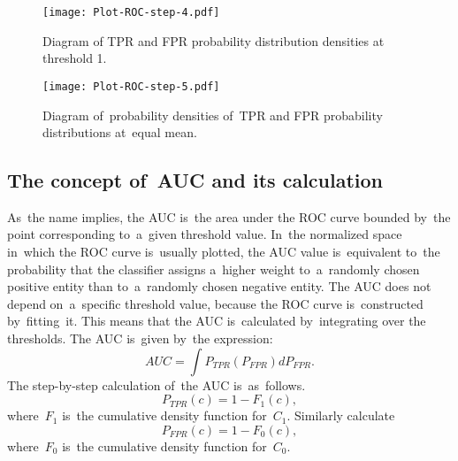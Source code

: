 \documentclass[]{scrreprt}
\begin{document}
%
\begin{figure}[ht]
	\centering
	\texttt{[image: Plot-ROC-step-4.pdf]}
	\caption{Diagram of TPR and FPR probability distribution densities at threshold 1.}
	\label{fig:plot-TPR-FPR-prob-density-4}
\end{figure}
%
\begin{figure}[ht]
	\centering
	\texttt{[image: Plot-ROC-step-5.pdf]}
	\caption{Diagram of~probability densities of~TPR and FPR probability distributions at~equal mean.}
	\label{fig:plot-TPR-FPR-prob-density-5}
\end{figure}
%
\subsection{The concept of~AUC and its calculation}
As~the name implies, the AUC is~the area under the ROC curve bounded by~the point corresponding to~a~given threshold value. In~the normalized space in~which the ROC curve is~usually plotted, the AUC value is~equivalent to~the probability that the classifier assigns a~higher weight to~a~randomly chosen positive entity than to~a~randomly chosen negative entity. The AUC does not depend on~a~specific threshold value, because the ROC curve is~constructed by~fitting~it. This means that the AUC is~calculated by~integrating over the thresholds. The AUC is~given by~the expression:
\begin{equation}\label{eq:AUC-computation-0}
AUC = \int P_{TPR}(P_{FPR}) d P_{FPR}.
\end{equation}
The step-by-step calculation of~the AUC is~as~follows.
\begin{equation}\label{eq:AUC-computation-1}
P_{TPR}(c) = 1 - F_{1}(c),
\end{equation}
where~$F_{1}$ is~the cumulative density function for~$C_{1}$. Similarly calculate
\begin{equation}\label{eq:AUC-computation-2}
P_{FPR}(c) = 1 - F_{0}(c),
\end{equation}
where~$F_{0}$ is~the cumulative density function for~$C_{0}$.
\end{document}
